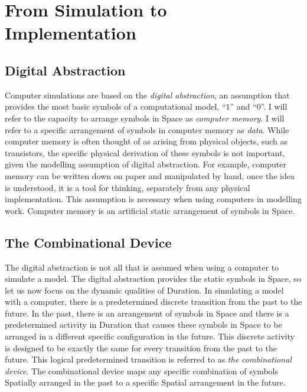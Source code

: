 \chapter{From Simulation to Implementation}
\label{chapter:from_simulation_to_implementation}

\section{Digital Abstraction}

Computer simulations are based on the \emph{digital abstraction}, an
assumption that provides the most basic symbols of a computational
model, ``$1$'' and ``$0$''.  I will refer to the capacity to arrange
symbols in Space as \emph{computer memory}.  I will refer to a
specific arrangement of symbols in computer memory as \emph{data}.
While computer memory is often thought of as arising from physical
objects, such as transistors, the specific physical derivation of
these symbols is not important, given the modelling assumption of
digital abstraction.  For example, computer memory can be written down
on paper and manipulated by hand, once the idea is understood, it is a
tool for thinking, separately from any physical implementation.  This
assumption is necessary when using computers in modelling work.
Computer memory is an artificial static arrangement of symbols in
Space.

\section{The Combinational Device}

The digital abstraction is not all that is assumed when using a
computer to simulate a model.  The digital abstraction provides the
static symbols in Space, so let us now focus on the dynamic qualities
of Duration.  In simulating a model with a computer, there is a
predetermined discrete transition from the past to the future.  In the
past, there is an arrangement of symbols in Space and there is a
predetermined activity in Duration that causes these symbols in Space
to be arranged in a different specific configuration in the future.
This discrete activity is designed to be exactly the same for every
transition from the past to the future.  This logical predetermined
transition is referred to as \emph{the combinational device}.  The
combinational device maps any specific combination of symbols
Spatially arranged in the past to a specific Spatial arrangement in
the future.

